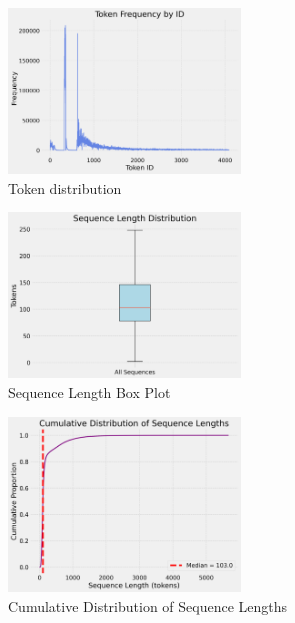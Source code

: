 \documentclass[a4paper,12pt]{extarticle}
\begin{document}
\begin{figure}[H]
    \centering
    \includegraphics[width=0.55\textwidth]{visualization_4096_REMI_train_manual_tokens_True_random_padding_True_token_frequency_by_id.png}
    \caption{Token distribution}
    \label{fig:token_distribution}
\end{figure}

\begin{figure}[H]
    \centering
    \includegraphics[width=0.55\textwidth]{seq_len_box_plot.png}
    \caption{Sequence Length Box Plot}
    \label{fig:seq_len_box_plot}
\end{figure}
\begin{figure}[H]
    \centering
    \includegraphics[width=0.55\textwidth]{visualization_4096_REMI_train_manual_tokens_True_random_padding_True_cumulative_length_distribution.png}
    \caption{Cumulative Distribution of Sequence Lengths}
    \label{fig:cumulative_seq_len}
\end{figure}
\end{document}
